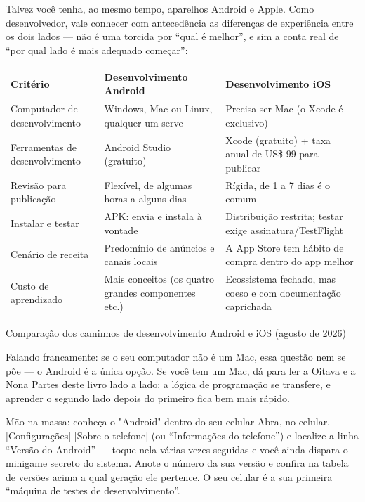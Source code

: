 Talvez você tenha, ao mesmo tempo, aparelhos Android e Apple. Como desenvolvedor, vale conhecer com antecedência as diferenças de experiência entre os dois lados — não é uma torcida por “qual é melhor”, e sim a conta real de “por qual lado é mais adequado começar”:

\begin{center}
\begin{tabularx}{\linewidth}{|X|X|X|}
\hline
\textbf{Critério} & \textbf{Desenvolvimento Android} & \textbf{Desenvolvimento iOS} \tabularnewline
\hline
Computador de desenvolvimento & Windows, Mac ou Linux, qualquer um serve & Precisa ser Mac (o Xcode é exclusivo) \tabularnewline
Ferramentas de desenvolvimento & Android Studio (gratuito) & Xcode (gratuito) + taxa anual de US\$ 99 para publicar \tabularnewline
Revisão para publicação & Flexível, de algumas horas a alguns dias & Rígida, de 1 a 7 dias é o comum \tabularnewline
Instalar e testar & APK: envia e instala à vontade & Distribuição restrita; testar exige assinatura/TestFlight \tabularnewline
Cenário de receita & Predomínio de anúncios e canais locais & A App Store tem hábito de compra dentro do app melhor \tabularnewline
Custo de aprendizado & Mais conceitos (os quatro grandes componentes etc.) & Ecossistema fechado, mas coeso e com documentação caprichada \tabularnewline
\hline
\end{tabularx}
\end{center}

\begin{center}\small\color{gray}Comparação dos caminhos de desenvolvimento Android e iOS (agosto de 2026)\end{center}

Falando francamente: se o seu computador não é um Mac, essa questão nem se põe — o Android é a única opção. Se você tem um Mac, dá para ler a Oitava e a Nona Partes deste livro lado a lado: a lógica de programação se transfere, e aprender o segundo lado depois do primeiro fica bem mais rápido.

\begin{tcbpractice}{Mão na massa: conheça o "Android" dentro do seu celular}
Abra, no celular, [Configurações] [Sobre o telefone] (ou “Informações do telefone”) e localize a linha “Versão do Android” — toque nela várias vezes seguidas e você ainda dispara o minigame secreto do sistema. Anote o número da sua versão e confira na tabela de versões acima a qual geração ele pertence. O seu celular é a sua primeira “máquina de testes de desenvolvimento”.

\end{tcbpractice}

